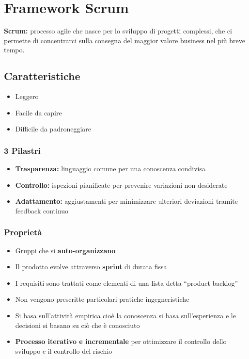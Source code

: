 \section{Framework Scrum}
\begin{mdframed}
    \textbf{Scrum:} processo agile che nasce per lo sviluppo di progetti complessi, che ci permette di concentrarci sulla consegna del maggior valore business nel più breve tempo.
\end{mdframed}

\subsection{Caratteristiche}
\begin{itemize}
    \item Leggero
    \item Facile da capire
    \item Difficile da padroneggiare
\end{itemize}

\subsubsection{3 Pilastri}
\begin{itemize}
    \item \textbf{Trasparenza:} linguaggio comune per una conoscenza condivisa
    \item \textbf{Controllo:} ispezioni pianificate per prevenire variazioni non desiderate
    \item \textbf{Adattamento:} aggiustamenti per minimizzare ulteriori deviazioni tramite feedback continuo
\end{itemize}

\subsubsection{Proprietà}
\begin{itemize}
    \item Gruppi che si \textbf{auto-organizzano}
    \item Il prodotto evolve attraverso \textbf{sprint} di durata fissa
    \item I requisiti sono trattati come elementi di una lista detta “product backlog”
    \item Non vengono prescritte particolari pratiche ingegneristiche
    \item Si basa sull'attività empirica cioè la conoscenza si basa sull'esperienza e le decisioni si basano su ciò che è conosciuto
    \item \textbf{Processo iterativo e incrementale} per ottimizzare il controllo dello sviluppo e il controllo del rischio
\end{itemize}

